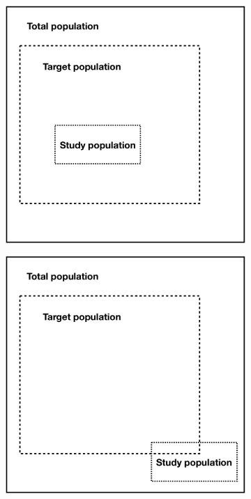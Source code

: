\begin{figure}[ht]
\centering
\begin{subfigure}{0.45\linewidth}
    \includegraphics[width=\linewidth]{main_figures/discussion/populations_1.png}
    \caption{}
    \label{fig:statistical_populations1}
\end{subfigure}
\hfill
\begin{subfigure}{0.45\linewidth}
    \includegraphics[width=\linewidth]{main_figures/discussion/populations_2.png}

\end{subfigure}
\end{figure}
